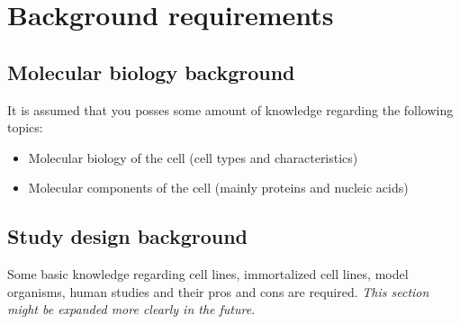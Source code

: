 \chapter*{Background requirements} 

  \section*{Molecular biology background}
    It is assumed that you posses some amount of knowledge regarding the following topics:
    \begin{itemize}
      \item Molecular biology of the cell (cell types and characteristics)
      \item Molecular components of the cell (mainly proteins and nucleic acids)
    \end{itemize}

  \section*{Study design background}
    Some basic knowledge regarding cell lines, immortalized cell lines, model organisms, human studies and their pros and cons are required. \textit{This section might be expanded more clearly in the future}.

